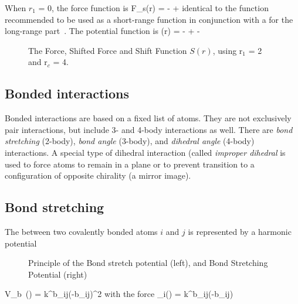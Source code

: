 When $r_1$ = 0, the force function is
\beq
 F_s(r) =  -  + 
\eeq
identical to the {\em {}} 
function recommended to be used as a short-range function in 
conjunction with a  
for the long-range part~\cite{Berendsen93a}. The potential function is
\beq
\Phi(r) =  -  +  - 
\eeq
\begin {figure}[ht]
\centerline{}
\caption {The Force, Shifted Force and Shift Function $S(r)$, using r$_1$ = 2 and r$_c$ = 4.}
\label{fig:shift}
\end {figure}


\subsection{Bonded interactions}
Bonded interactions are based on a fixed list of atoms. They are not
exclusively pair interactions, but include 3- and 4-body interactions
as well. There are {\em bond stretching} (2-body), {\em bond angle}
(3-body), and {\em dihedral angle} (4-body) interactions. A special
type of dihedral interaction (called {\em improper dihedral} is used
to force atoms to remain in a plane or to prevent transition to a
configuration of opposite chirality (a mirror image).  

\subsection{Bond stretching}
The  between two covalently bonded atoms $i$ and $j$ is represented by a harmonic potential
\begin {figure}[ht]
\centerline{}
\caption{Principle of the Bond stretch potential (left), and Bond Stretching Potential (right)}
\label{fig:bstretch1}
\end {figure}

\beq
V_b~(\rij) = \half k^b_{ij}(\rij-b_{ij})^2
\eeq
with the force
\beq
{}_i(\rvij)	= k^b_{ij}(\rij-b_{ij}) \rnorm
\eeq

